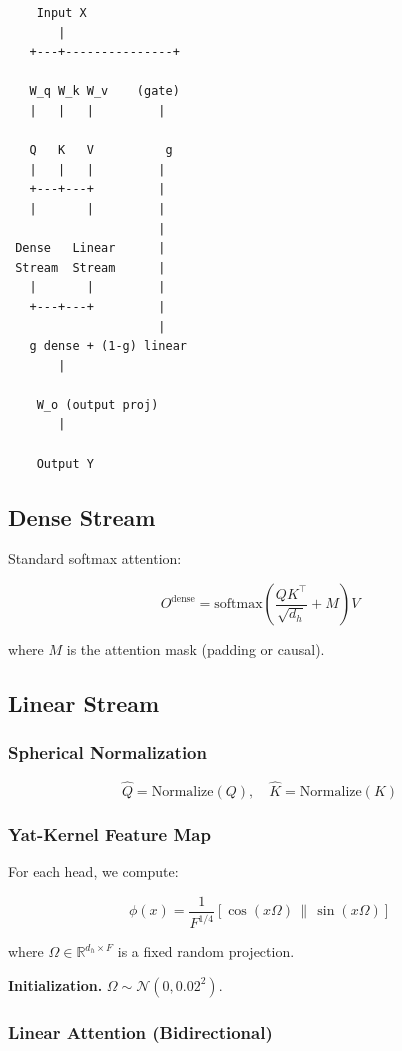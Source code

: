 \begin{lstlisting}
    Input X
       |
   +---+---------------+
                        
   W_q W_k W_v    (gate)
   |   |   |         |
                      
   Q   K   V          g
   |   |   |         |
   +---+---+         |
   |       |         |
                     |
 Dense   Linear      |
 Stream  Stream      |
   |       |         |
   +---+---+         |
                     |
   g dense + (1-g) linear
       |
        
    W_o (output proj)
       |
        
    Output Y
\end{lstlisting}

\subsection{Dense Stream}

Standard softmax attention:

\[
O^\text{dense} = \text{softmax}\!\left(\frac{Q K^\top}{\sqrt{d_h}} + M\right) V
\]

where $M$ is the attention mask (padding or causal).

\subsection{Linear Stream}

\subsubsection{Spherical Normalization}

\[
\hat{Q} = \text{Normalize}(Q), \quad
\hat{K} = \text{Normalize}(K)
\]

\subsubsection{Yat-Kernel Feature Map}

For each head, we compute:

\[
\phi(x) = \frac{1}{F^{1/4}} \left[ \cos(x \Omega) \,\|\, \sin(x \Omega) \right]
\]

where $\Omega \in \mathbb{R}^{d_h \times F}$ is a fixed random projection.

\textbf{Initialization.} $\Omega \sim \mathcal{N}(0, 0.02^2)$.

\subsubsection{Linear Attention (Bidirectional)}


